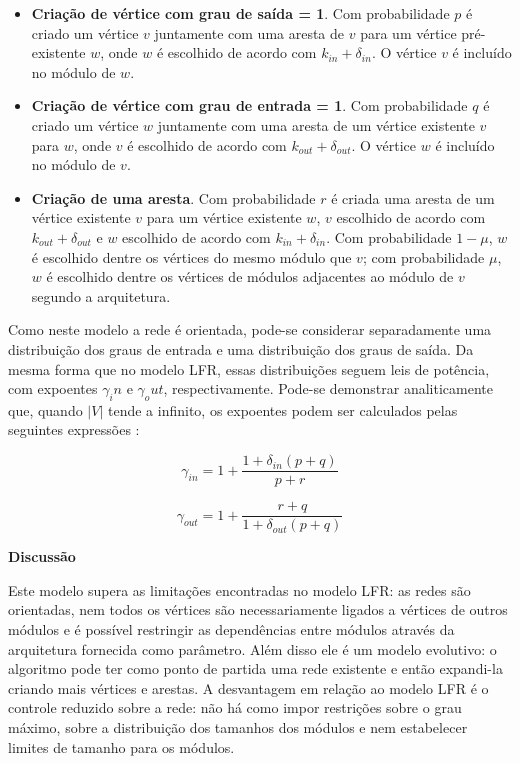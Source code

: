 \documentclass{acm_proc_article-sp}
\begin{document}
\begin{itemize}
  \item \textbf{Criação de vértice com grau de saída = 1}. Com probabilidade $p$ é criado um vértice $v$ juntamente com uma aresta de $v$ para um vértice pré-existente $w$, onde $w$ é escolhido de acordo com $k_{in} + \delta_{in}$. O vértice $v$ é incluído no módulo de $w$.
  \item \textbf{Criação de vértice com grau de entrada = 1}. Com probabilidade $q$ é criado um vértice $w$ juntamente com uma aresta de um vértice existente $v$ para $w$, onde $v$ é escolhido de acordo com $k_{out} + \delta_{out}$. O vértice $w$ é incluído no módulo de $v$.
  \item \textbf{Criação de uma aresta}. Com probabilidade $r$ é criada uma aresta de um vértice existente $v$ para um vértice existente $w$, $v$ escolhido de acordo com $k_{out} + \delta_{out}$ e $w$ escolhido de acordo com $k_{in} + \delta_{in}$. Com probabilidade $1 - \mu$, $w$ é escolhido dentre os vértices do mesmo módulo que $v$; com probabilidade $\mu$, $w$ é escolhido dentre os vértices de módulos adjacentes ao módulo de $v$ segundo a arquitetura. 
\end{itemize}

Como neste modelo a rede é orientada, pode-se considerar separadamente uma distribuição dos graus de entrada e uma distribuição dos graus de saída. Da mesma forma que no modelo LFR, essas distribuições seguem leis de potência, com expoentes $\gamma_in$ e $\gamma_out$, respectivamente. Pode-se demonstrar analiticamente que, quando $|V|$ tende a infinito, os expoentes podem ser calculados pelas seguintes expressões \cite{Bollobas2003}:

\begin{equation}
\gamma_{in} = 1 + \frac{1 + \delta_{in}(p + q)}{p + r}
\end{equation}

\begin{equation}
\gamma_{out} = 1 + \frac{r + q}{1 + \delta_{out}(p + q)}
\end{equation}

  \textbf{Discussão}

Este modelo supera as limitações encontradas no modelo LFR: as redes são orientadas, nem todos os vértices são necessariamente ligados a vértices de outros módulos e é possível restringir as dependências entre módulos através da arquitetura fornecida como parâmetro. Além disso ele é um modelo evolutivo: o algoritmo pode ter como ponto de partida uma rede existente e então expandi-la criando mais vértices e arestas. A desvantagem em relação ao modelo LFR é o controle reduzido sobre a rede: não há como impor restrições sobre o grau máximo, sobre a distribuição dos tamanhos dos módulos e nem estabelecer limites de tamanho para os módulos.
\end{document}
